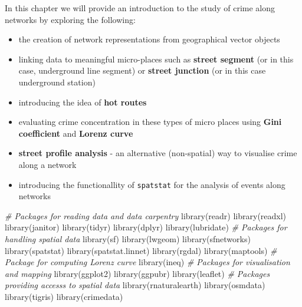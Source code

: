 \documentclass[
  krantz2]{krantz}
\makeatletter
\newenvironment{Shaded}{\begin{snugshade}}{\end{snugshade}}
\newcommand{\CommentTok}[1]{\textcolor[rgb]{0.37,0.37,0.37}{\textit{#1}}}
\newcommand{\FunctionTok}[1]{\textcolor[rgb]{0,0,0}{#1}}
\newcommand{\NormalTok}[1]{#1}
\providecommand{\tightlist}{%
  \setlength{\itemsep}{0pt}\setlength{\parskip}{0pt}}
\newenvironment{kframe}{%
\medskip{}
\setlength{\fboxsep}{.8em}
 \def\at@end@of@kframe{}%
 \ifinner\ifhmode%
  \def\at@end@of@kframe{\end{minipage}}%
  \begin{minipage}{\columnwidth}%
 \fi\fi%
 \def\FrameCommand##1{\hskip\@totalleftmargin \hskip-\fboxsep
 \colorbox{shadecolor}{##1}\hskip-\fboxsep
     \hskip-\linewidth \hskip-\@totalleftmargin \hskip\columnwidth}%
 \MakeFramed {\advance\hsize-\width
   \@totalleftmargin\z@ \linewidth\hsize
   \@setminipage}}%
 {\par\unskip\endMakeFramed%
 \at@end@of@kframe}
\renewenvironment{Shaded}{\begin{kframe}}{\end{kframe}}
\makeatother
\begin{document}
In this chapter we will provide an introduction to the study of crime along networks by exploring the following:

\begin{itemize}
\tightlist
\item
  the creation of network representations from geographical vector objects
\item
  linking data to meaningful micro-places such as \textbf{street segment} (or in this case, underground line segment) or \textbf{street junction} (or in this case underground station)
\item
  introducing the idea of \textbf{hot routes}
\item
  evaluating crime concentration in these types of micro places using \textbf{Gini coefficient} and \textbf{Lorenz curve}
\item
  \textbf{street profile analysis} - an alternative (non-spatial) way to visualise crime along a network
\item
  introducing the functionallity of \texttt{spatstat} for the analysis of events along networks
\end{itemize}

\begin{Shaded}
\begin{Highlighting}[]
\CommentTok{\# Packages for reading data and data carpentry}
\FunctionTok{library}\NormalTok{(readr)}
\FunctionTok{library}\NormalTok{(readxl)}
\FunctionTok{library}\NormalTok{(janitor)}
\FunctionTok{library}\NormalTok{(tidyr)}
\FunctionTok{library}\NormalTok{(dplyr)}
\FunctionTok{library}\NormalTok{(lubridate)}
\CommentTok{\# Packages for handling spatial data}
\FunctionTok{library}\NormalTok{(sf)}
\FunctionTok{library}\NormalTok{(lwgeom)}
\FunctionTok{library}\NormalTok{(sfnetworks)}
\FunctionTok{library}\NormalTok{(spatstat)}
\FunctionTok{library}\NormalTok{(spatstat.linnet)}
\FunctionTok{library}\NormalTok{(rgdal)}
\FunctionTok{library}\NormalTok{(maptools)}
\CommentTok{\# Package for computing Lorenz curve}
\FunctionTok{library}\NormalTok{(ineq)}
\CommentTok{\# Packages for visualisation and mapping}
\FunctionTok{library}\NormalTok{(ggplot2)}
\FunctionTok{library}\NormalTok{(ggpubr)}
\FunctionTok{library}\NormalTok{(leaflet)}
\CommentTok{\# Packages providing accesss to spatial data}
\FunctionTok{library}\NormalTok{(rnaturalearth)}
\FunctionTok{library}\NormalTok{(osmdata)}
\FunctionTok{library}\NormalTok{(tigris)}
\FunctionTok{library}\NormalTok{(crimedata)}
\end{Highlighting}
\end{Shaded}
\end{document}
